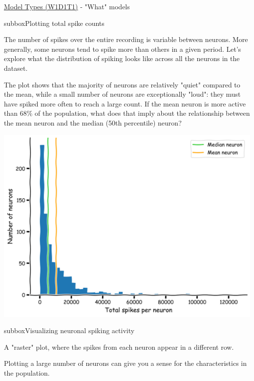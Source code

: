 \begin{textbox}{\href{https://compneuro.neuromatch.io/tutorials/W1D1_ModelTypes/student/W1D1_Tutorial1.html}{Model Types (W1D1T1)} -  "What" models}
\begin{subbox}{subbox}{Plotting total spike counts}
\scriptsize

The number of spikes over the entire recording is variable between neurons. More generally, some neurons tend to spike more than others in a given period. Let's explore what the distribution of spiking looks like across all the neurons in the dataset.

The plot shows that the majority of neurons are relatively "quiet" compared to the mean, while a small number of neurons are exceptionally "loud": they must have spiked more often to reach a large count.
If the mean neuron is more active than 68\% of the population, what does that imply about the relationship between the mean neuron and the median (50th percentile) neuron?

\centering
\includegraphics[scale=0.11]{Figures/MT/MT_Figure1.png}
\end{subbox}


\begin{subbox}{subbox}{Visualizing neuronal spiking activity}
\scriptsize

A "raster" plot, where the spikes from each neuron appear in a different row.

Plotting a large number of neurons can give you a sense for the characteristics in the population. 


\end{subbox}
\end{textbox}
